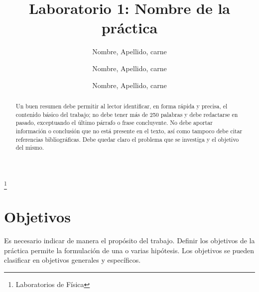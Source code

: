 \documentclass[osajnl,twocolumn,showpacs,superscriptaddress,10pt]{revtex4-1}
\begin{document}

\title{Laboratorio 1: Nombre de la práctica}
\thanks{Laboratorios de Física}

\author{Nombre, Apellido, carne}
%
\author{Nombre, Apellido, carne}
%
\author{Nombre, Apellido, carne}
%



\begin{abstract}

    Un buen resumen debe permitir al lector identificar, en forma rápida y precisa, el contenido básico del trabajo; no debe tener más de 250 palabras y debe redactarse en pasado, exceptuando el último párrafo o frase concluyente. No debe aportar información o conclusión que no está presente en el texto, así como tampoco debe citar referencias bibliográficas. Debe quedar claro el problema que se investiga y el objetivo del mismo.

\end{abstract}

\maketitle{}

\section{Objetivos}

    Es necesario indicar de manera el propósito del trabajo. Definir los objetivos de la práctica permite la formulación de una o varias hipótesis. Los objetivos se pueden clasificar en objetivos generales y específicos.
\end{document}
